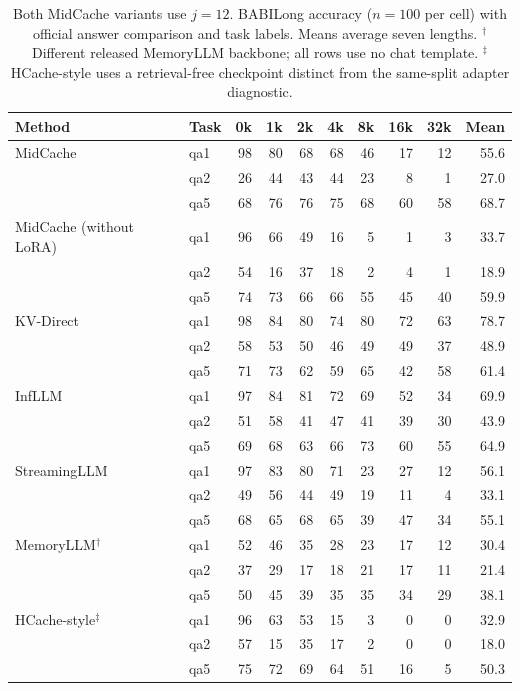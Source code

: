 \begin{table}[htbp]
\centering
\small
\setlength{\tabcolsep}{4pt}
\begin{tabular}{@{}llrrrrrrrr@{}}
\toprule
Method & Task & 0k & 1k & 2k & 4k & 8k & 16k & 32k & Mean \\
\midrule
MidCache & qa1 & 98 & 80 & 68 & 68 & 46 & 17 & 12 & 55.6 \\
 & qa2 & 26 & 44 & 43 & 44 & 23 & 8 & 1 & 27.0 \\
 & qa5 & 68 & 76 & 76 & 75 & 68 & 60 & 58 & 68.7 \\
\midrule
MidCache (without LoRA) & qa1 & 96 & 66 & 49 & 16 & 5 & 1 & 3 & 33.7 \\
 & qa2 & 54 & 16 & 37 & 18 & 2 & 4 & 1 & 18.9 \\
 & qa5 & 74 & 73 & 66 & 66 & 55 & 45 & 40 & 59.9 \\
\midrule
KV-Direct & qa1 & 98 & 84 & 80 & 74 & 80 & 72 & 63 & 78.7 \\
 & qa2 & 58 & 53 & 50 & 46 & 49 & 49 & 37 & 48.9 \\
 & qa5 & 71 & 73 & 62 & 59 & 65 & 42 & 58 & 61.4 \\
\midrule
InfLLM & qa1 & 97 & 84 & 81 & 72 & 69 & 52 & 34 & 69.9 \\
 & qa2 & 51 & 58 & 41 & 47 & 41 & 39 & 30 & 43.9 \\
 & qa5 & 69 & 68 & 63 & 66 & 73 & 60 & 55 & 64.9 \\
\midrule
StreamingLLM & qa1 & 97 & 83 & 80 & 71 & 23 & 27 & 12 & 56.1 \\
 & qa2 & 49 & 56 & 44 & 49 & 19 & 11 & 4 & 33.1 \\
 & qa5 & 68 & 65 & 68 & 65 & 39 & 47 & 34 & 55.1 \\
\midrule
MemoryLLM$^\dagger$ & qa1 & 52 & 46 & 35 & 28 & 23 & 17 & 12 & 30.4 \\
 & qa2 & 37 & 29 & 17 & 18 & 21 & 17 & 11 & 21.4 \\
 & qa5 & 50 & 45 & 39 & 35 & 35 & 34 & 29 & 38.1 \\
\midrule
HCache-style$^{\ddagger}$ & qa1 & 96 & 63 & 53 & 15 & 3 & 0 & 0 & 32.9 \\
 & qa2 & 57 & 15 & 35 & 17 & 2 & 0 & 0 & 18.0 \\
 & qa5 & 75 & 72 & 69 & 64 & 51 & 16 & 5 & 50.3 \\
\bottomrule
\end{tabular}
\caption{Both MidCache variants use $j=12$. BABILong accuracy ($n=100$ per cell) with official answer comparison and task labels. Means average seven lengths. $^\dagger$Different released MemoryLLM backbone; all rows use no chat template. $^{\ddagger}$HCache-style uses a retrieval-free checkpoint distinct from the same-split adapter diagnostic.}
\label{tab:babilong-detail}
\end{table}
